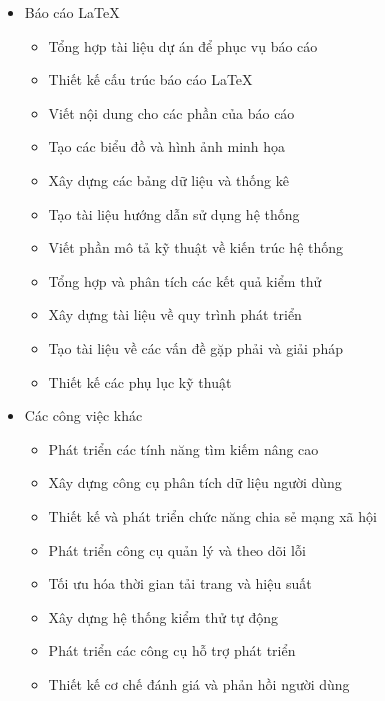 \begin{itemize}
    \item Báo cáo LaTeX
    \begin{itemize}
        \item Tổng hợp tài liệu dự án để phục vụ báo cáo
        \item Thiết kế cấu trúc báo cáo LaTeX
        \item Viết nội dung cho các phần của báo cáo
        \item Tạo các biểu đồ và hình ảnh minh họa
        \item Xây dựng các bảng dữ liệu và thống kê
        \item Tạo tài liệu hướng dẫn sử dụng hệ thống
        \item Viết phần mô tả kỹ thuật về kiến trúc hệ thống
        \item Tổng hợp và phân tích các kết quả kiểm thử
        \item Xây dựng tài liệu về quy trình phát triển
        \item Tạo tài liệu về các vấn đề gặp phải và giải pháp
        \item Thiết kế các phụ lục kỹ thuật
    \end{itemize}
    
    \item Các công việc khác
    \begin{itemize}
        \item Phát triển các tính năng tìm kiếm nâng cao
        \item Xây dựng công cụ phân tích dữ liệu người dùng
        \item Thiết kế và phát triển chức năng chia sẻ mạng xã hội
        \item Phát triển công cụ quản lý và theo dõi lỗi
        \item Tối ưu hóa thời gian tải trang và hiệu suất
        \item Xây dựng hệ thống kiểm thử tự động
        \item Phát triển các công cụ hỗ trợ phát triển
        \item Thiết kế cơ chế đánh giá và phản hồi người dùng
    \end{itemize}
\end{itemize}